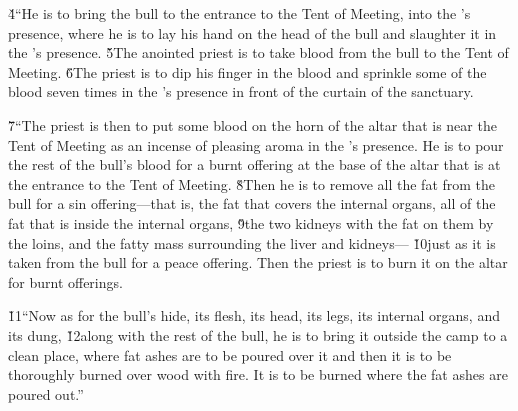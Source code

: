 \v{4}``He is to bring the bull to the entrance to the Tent of Meeting, into the 's presence, where he is to lay his hand on the head of the bull and slaughter it in the 's presence. \v{5}The anointed priest is to take blood from the bull to the Tent of Meeting. \v{6}The priest is to dip his finger in the blood and sprinkle some of the blood seven times in the 's presence in front of the curtain of the sanctuary.

\v{7}``The priest is then to put some blood on the horn of the altar that is near the Tent of Meeting as an incense of pleasing aroma in the 's presence. He is to pour the rest of the bull's blood for a burnt offering at the base of the altar that is at the entrance to the Tent of Meeting. \v{8}Then he is to remove all the fat from the bull for a sin offering---that is, the fat that covers the internal organs, all of the fat that is inside the internal organs, \v{9}the two kidneys with the fat on them by the loins, and the fatty mass surrounding the liver and kidneys--- \v{10}just as it is taken from the bull for a peace offering. Then the priest is to burn it on the altar for burnt offerings.

\v{11}``Now as for the bull's hide, its flesh, its head, its legs, its internal organs, and its dung, \v{12}along with the rest of the bull, he is to bring it outside the camp to a clean place, where fat ashes are to be poured over it and then it is to be thoroughly burned over wood with fire. It is to be burned where the fat ashes are poured out.''

